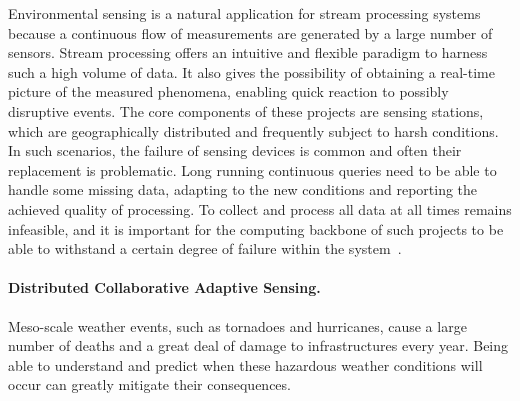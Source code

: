 Environmental sensing is a natural application for stream processing systems because a continuous flow of
measurements are generated by a large number of sensors. Stream processing offers an intuitive and
flexible paradigm to harness such a high volume of data. It also gives the possibility of obtaining a
real-time picture of the measured phenomena, enabling quick reaction to possibly disruptive events. The
core components of these projects are sensing stations, which are geographically distributed and
frequently subject to harsh conditions. In such scenarios, the failure of sensing devices is common and
often their replacement is problematic. Long running continuous queries need to be able to handle some missing
data, adapting to the new conditions and reporting the achieved quality of processing. To collect and
process all data at all times remains infeasible, and it is important for the computing backbone of such
projects to be able to withstand a certain degree of failure within the system~\cite{dependable-is-sensing}.
% 
\paragraph{Distributed Collaborative Adaptive Sensing.} Meso-scale weather events, such as tornadoes and
hurricanes, cause a large number of deaths and a great deal of damage to infrastructures every year.
Being able to understand and predict when these hazardous weather conditions will occur can greatly
mitigate their consequences.

